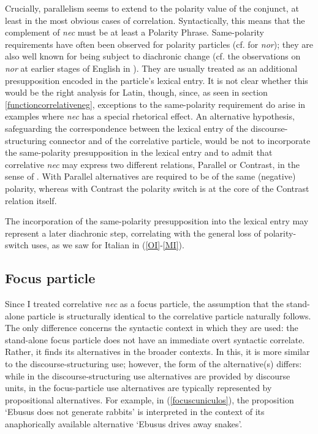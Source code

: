 \documentclass[output=paper,modfonts,nonflat,citecolor=brown,
showindex
]{langsci/langscibook}
\begin{document}
\noindent Crucially, parallelism seems to extend to the polarity value of the conjunct, at least in the most obvious cases of correlation. Syntactically, this means that the complement of {\em{nec}} must be at least a Polarity Phrase. Same-polarity requirements have often been observed for polarity particles (cf. \citealt[519-520]{Wurmbrand08} for {\em{nor}}); they are also well known for being subject to diachronic change (cf. the observations on {\em{nor}} at earlier stages of English in \citealt[114]{Jespersen17}). They are usually treated as an additional presupposition encoded in the particle's lexical entry. It is not clear whether this would be the right analysis for Latin, though, since, as seen in section \ref{functioncorrelativeneg}, exceptions to the same-polarity requirement do arise in examples where {\em{nec}} has a special rhetorical effect. An alternative hypothesis, safeguarding the correspondence between the lexical entry of the discourse-structuring connector and of the correlative particle, would be not to incorporate the same-polarity presupposition in the lexical entry and to admit that correlative {\em{nec}} may express two different relations, Parallel or Contrast, in the sense of \citet{Asher93}. With Parallel alternatives are required to be of the same (negative) polarity, whereas with Contrast the polarity switch is at the core of the Contrast relation itself. 

The incorporation of the same-polarity presupposition into the lexical entry may represent a later diachronic step, correlating with the general loss of polarity-switch uses, as we saw for Italian in (\ref{OI}-\ref{MI}).

\subsection{Focus particle}

Since I treated correlative {\em{nec}} as a focus particle, the assumption that the stand-alone particle is structurally identical to the correlative particle naturally follows. The only difference concerns the syntactic context in which they are used: the stand-alone focus particle does not have an immediate overt syntactic correlate. Rather, it finds its alternatives in the broader contexts. In this, it is more similar to the discourse-structuring use; however, the form of the alternative(s) differs: while in the discourse-structuring use alternatives are provided by discourse units, in the focus-particle use alternatives are typically represented by propositional alternatives. For example, in (\ref{focuscuniculos}), the proposition `Ebusus does not generate rabbits' is interpreted in the context of its anaphorically available alternative `Ebusus drives away snakes'. 
\end{document}
